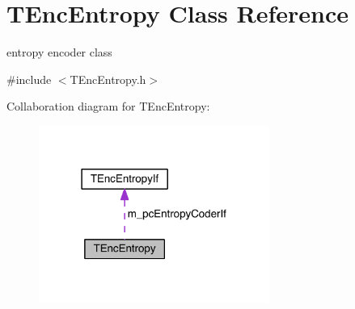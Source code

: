\hypertarget{class_t_enc_entropy}{}\section{T\+Enc\+Entropy Class Reference}
\label{class_t_enc_entropy}


entropy encoder class  




{\ttfamily \#include $<$T\+Enc\+Entropy.\+h$>$}



Collaboration diagram for T\+Enc\+Entropy\+:
\nopagebreak
\begin{figure}[H]
\begin{center}
\leavevmode
\includegraphics[width=214pt]{d3/d22/class_t_enc_entropy__coll__graph}
\end{center}
\end{figure}
